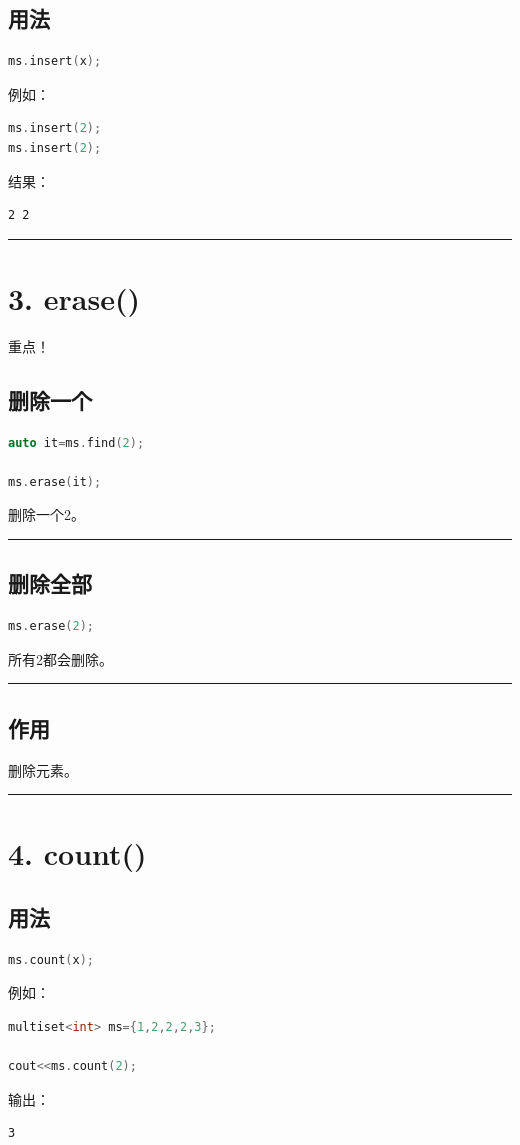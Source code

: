 \documentclass[10pt,twocolumn]{extarticle}
\begin{document}
\subsection{用法}
\begin{lstlisting}[language=C++]
ms.insert(x);
\end{lstlisting}
例如：
\begin{lstlisting}[language=C++]
ms.insert(2);
ms.insert(2);
\end{lstlisting}
结果：
\begin{lstlisting}
2 2
\end{lstlisting}

\noindent\rule{\linewidth}{0.4pt}

\section{3. erase()}

重点！

\subsection{删除一个}
\begin{lstlisting}[language=C++]
auto it=ms.find(2);

ms.erase(it);
\end{lstlisting}
删除一个2。

\noindent\rule{\linewidth}{0.4pt}

\subsection{删除全部}
\begin{lstlisting}[language=C++]
ms.erase(2);
\end{lstlisting}
所有2都会删除。

\noindent\rule{\linewidth}{0.4pt}

\subsection{作用}
删除元素。

\noindent\rule{\linewidth}{0.4pt}

\section{4. count()}

\subsection{用法}
\begin{lstlisting}[language=C++]
ms.count(x);
\end{lstlisting}
例如：
\begin{lstlisting}[language=C++]
multiset<int> ms={1,2,2,2,3};

cout<<ms.count(2);
\end{lstlisting}
输出：
\begin{lstlisting}
3
\end{lstlisting}
\end{document}
